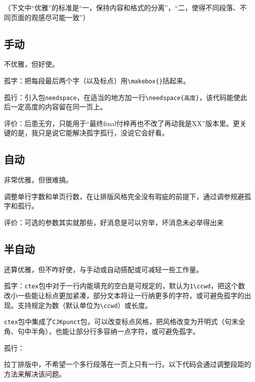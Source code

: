 \documentclass[10pt,openany]{book}
\begin{document}
\begin{sloppypar}
    （下文中“优雅”的标准是“一，保持内容和格式的分离”，“二，使得不同段落、不同页面的观感尽可能一致”）

    \subsection{手动}

    不优雅，但好使。

    孤字：把每段最后两个字（以及标点）用\texttt{\textbackslash{}makebox\{\}}括起来。

    孤行：引入包\texttt{needspace}，在适当的地方加一行\texttt{\textbackslash{}needspace\{高度\}}，该代码能使此后一定高度的内容留在同一页上。

    评价：后患无穷，只能用于“最终final付梓再也不改了再动我是XX”版本里。更关键的是，我只是说它能解决孤字孤行，没说它会好看。

    \subsection{自动}

    非常优雅，但很难搞。

    调整单行字数和单页行数，在让排版风格完全没有瑕疵的前提下，通过调参规避孤字和孤行。

    评价：可选的参数其实就那些，好消息是可以穷举，坏消息未必举得出来

    \subsection{半自动}

    还算优雅，但不咋好使，与手动或自动搭配或可减轻一些工作量。

    孤字：\texttt{ctex}包中对于一行内能填充的空白是可规定的，默认为\texttt{1\textbackslash{}ccwd}，把这个数改小一些能让标点更加紧凑，部分文本将让一行纳更多的字符，或可避免孤字的出现。支持规定为数（默认单位为\texttt{\textbackslash{}ccwd}）或长度。

    

    \texttt{ctex}包中集成了\texttt{CJKpunct}包，可以改变标点风格，把风格改变为开明式（句末全角、句中半角），也能让部分行多容纳一点字符，或可避免孤字。

    

    孤行：

    拉丁排版中，不希望一个多行段落在一页上只有一行。以下代码会通过调整段距的方法来解决该问题。


\end{sloppypar}
\end{document}
